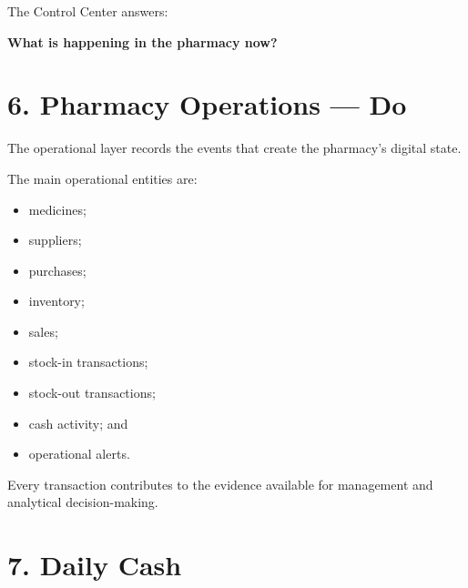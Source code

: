 \documentclass[12pt,a4paper]{article}
\begin{document}
The Control Center answers:

\begin{center}
\textbf{What is happening in the pharmacy now?}
\end{center}

\section*{6. Pharmacy Operations --- Do}

The operational layer records the events that create the pharmacy's digital state.

The main operational entities are:

\begin{itemize}[leftmargin=1cm]
\item medicines;
\item suppliers;
\item purchases;
\item inventory;
\item sales;
\item stock-in transactions;
\item stock-out transactions;
\item cash activity; and
\item operational alerts.
\end{itemize}

\begin{center}
\end{center}

Every transaction contributes to the evidence available for management and analytical decision-making.

\section*{7. Daily Cash}
\end{document}
